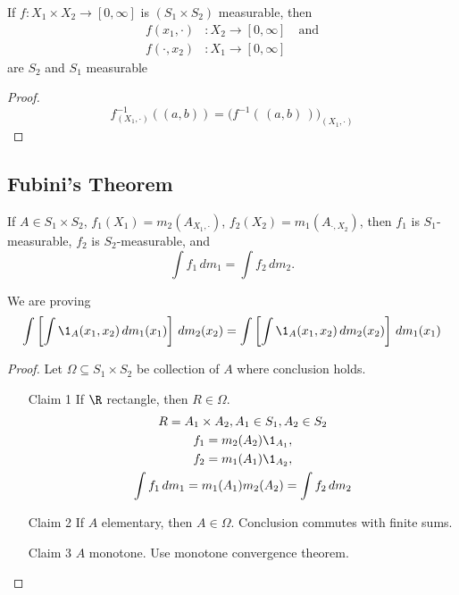 \begin{lemma}
	If $f : X_1 \times X_2 \to [0,\infty]$ is $(S_1 \times S_2)$ measurable, then
	\begin{align*}
		f(x_1, \cdot) &: X_2 \to [0,\infty] \quad \text{and} \\
		f(\cdot, x_2) &: X_1 \to [0,\infty]
	\end{align*}
	are $S_2$ and $S_1$ measurable
\end{lemma}

\begin{proof}
	\[
		f_{(X_1, \cdot)}^{-1}((a,b)) = \big(f^{-1}(\, (a,b) \,)\big)_{(X_1, \cdot)}
	\]
\end{proof}

\subsection{Fubini's Theorem}

\begin{lemma}\label{lem:f1f2}
	If $A \in S_1 \times S_2$, $f_1 (X_1) = m_2 (A_{X_1, \cdot})$, $f_2(X_2) = m_1 (A_{\cdot, X_2})$, then
	$f_1$ is $S_1$-measurable, $f_2$ is $S_2$-measurable, and 
	\[
		\int f_1 \, dm_1 = \int f_2 \, dm_2.
	\]
\end{lemma}

\begin{remark}
	We are proving
	\begin{align*}
		\int \left[ \int \1_A (x_1, x_2) \, dm_1 (x_1)\right] \, dm_2 (x_2) = \int \left[ \int \1_A (x_1, x_2) \, dm_2(x_2) \right] \, dm_1 (x_1)
	\end{align*}
\end{remark}

\begin{proof}
	Let $\Omega \subseteq S_1 \times S_2$ be collection of $A$ where conclusion holds.
	\begin{enumerate}
		\item[Claim 1] If $\R$ rectangle, then $R \in \Omega$.
			 \begin{gather*}
				 R = A_1 \times A_2, A_1 \in S_1, A_2 \in S_2 \\
				 f_1 = m_2 (A_2) \1_{A_1}, \\
				 f_2 = m_1 (A_1) \1_{A_2}, \\
				 \int f_1 \, dm_1 = m_1 (A_1) m_2(A_2) = \int f_2 \, dm_2
			\end{gather*}
		\item[Claim 2] If $A$ elementary, then $A \in \Omega$. Conclusion commutes with finite sums.
		\item[Claim 3] $A$ monotone. Use monotone convergence theorem.
	\end{enumerate}
\end{proof}


